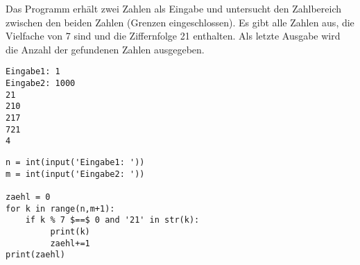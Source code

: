 \question[4]
Das Programm erhält zwei Zahlen als Eingabe und untersucht den Zahlbereich zwischen den
beiden Zahlen (Grenzen eingeschlossen).
Es gibt alle Zahlen aus, die Vielfache von 7 sind und die Ziffernfolge
21 enthalten. Als letzte Ausgabe wird die Anzahl der gefundenen Zahlen ausgegeben.

\begin{lstlisting}
Eingabe1: 1
Eingabe2: 1000
21
210
217
721
4
\end{lstlisting}

\begin{solutionbox}{5cm}
\begin{lstlisting}
n = int(input('Eingabe1: '))
m = int(input('Eingabe2: '))

zaehl = 0
for k in range(n,m+1):
    if k % 7 $==$ 0 and '21' in str(k):
         print(k)
         zaehl+=1
print(zaehl)
\end{lstlisting}
\end{solutionbox}
